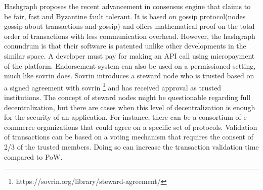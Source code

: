 Hashgraph \cite{baird2016hashgraph}  proposes the recent advancement in
consensus engine that claims to be fair, fast and Byzantine fault tolerant. It
is based on gossip protocol(nodes gossip about transactions and gossip) and
offers mathematical proof on the total order of transactions with less
communication overhead. However, the hashgraph conundrum is that their software
is patented unlike other developments in the similar space. A developer must
pay for making an API call using micropayment of the platform.  Endorsement
system can also be used on a permissioned setting, much like sovrin
\cite{tobin2016inevitable} does.  Sovrin introduces a steward node who is
trusted based on a signed agreement with sovrin
\footnote{https://sovrin.org/library/steward-agreement/} and has received
approval as trusted institutions. The concept of steward nodes might be
questionable regarding full decentralization, but there are cases when this
level of decentralization is enough for the security of an application.   For
instance, there can be a consortium of e-commerce organizations that could
agree on a specific set of protocols. Validation of transactions can be based
on a voting mechanism that requires the consent of 2/3 of the trusted members.
Doing so can increase the transaction validation time compared to PoW.   





 
